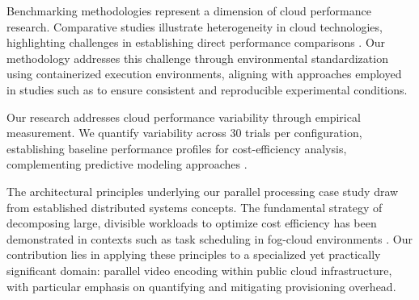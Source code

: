 \documentclass[conference]{IEEEtran}
\begin{document}
	Benchmarking methodologies represent a dimension of cloud performance research. Comparative studies illustrate heterogeneity in cloud technologies, highlighting challenges in establishing direct performance comparisons \cite{omar_alzakholi_0537f875, Maas2025}. Our methodology addresses this challenge through environmental standardization using containerized execution environments, aligning with approaches employed in studies such as \cite{arnaldo_pereira_ferreira_bd8560e5} to ensure consistent and reproducible experimental conditions.
	
	Our research addresses cloud performance variability through empirical measurement. We quantify variability across 30 trials per configuration, establishing baseline performance profiles for cost-efficiency analysis, complementing predictive modeling approaches \cite{joel_scheuner_a07bc84e, sepideh_ebneyousef_1d5c43ab}.
	
	The architectural principles underlying our parallel processing case study draw from established distributed systems concepts. The fundamental strategy of decomposing large, divisible workloads to optimize cost efficiency has been demonstrated in contexts such as task scheduling in fog-cloud environments \cite{tina_samizadeh_nikoui_765428f4, rumr2003}. Our contribution lies in applying these principles to a specialized yet practically significant domain: parallel video encoding within public cloud infrastructure, with particular emphasis on quantifying and mitigating provisioning overhead.
	
\end{document}
